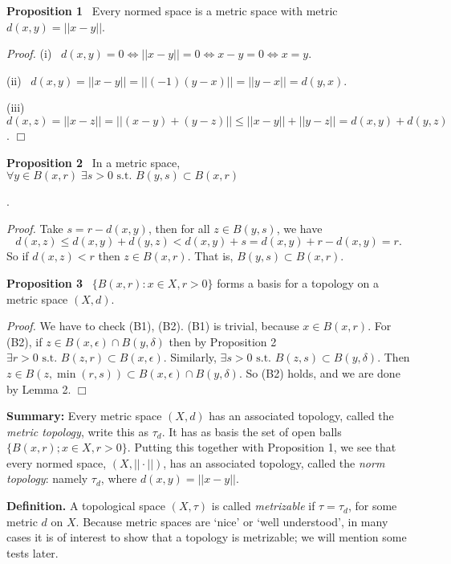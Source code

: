 \documentclass[12pt]{article}
\newcommand{\st}[0]{ \textrm{ s.t. } }
\newcommand{\lrimply}[0] { \Leftrightarrow }
\newcommand{\eps}[0] {  \epsilon }
\begin{document}
\begin{flushleft}
\begin{enumerate}
            \end{enumerate}\end{flushleft}\begin{flushleft} 
 { \bf Proposition  1 } \ Every normed space is a metric space with metric
 $d(x,y) = ||x-y||$.\begin{flushleft} 
 \emph{Proof.  }(i) \ $ d(x,y)=0 \lrimply ||x-y||=0 \lrimply x-y = 0 \lrimply x=y$.

 (ii) \ $d(x,y) = ||x-y|| = ||(-1)(y-x)|| = ||y-x|| = d(y,x)$. 

 (iii) \ $d(x,z) = ||x-z|| = ||(x-y)+(y-z)|| \le ||x-y|| + ||y - z|| = d(x,y) + d(y,z)$. $\Box$ \end{flushleft}\end{flushleft}\begin{flushleft} 
 { \bf Proposition  2 } \ In a metric space,
$\forall y \in B(x,r) \; \exists s > 0 \st B(y,s) \subset B(x,r)$\begin{flushleft}.

 \emph{Proof.  }Take $s = r - d(x,y)$, then for all $z \in B(y, s)$, we have
$$d(x,z) \le d(x,y) + d(y,z) < d(x,y) + s = d(x,y) + r - d(x,y) = r .$$ 
So if  $d(x,z) < r$ then $z \in B(x,r)$.  That is, $B(y,s) \subset B(x,r)$.
\end{flushleft}\end{flushleft}\begin{flushleft} 
 { \bf Proposition 3 } \ $\{ B(x, r) :  x \in X, r>0 \}$ forms a basis for a topology on a metric space $(X, d)$.\begin{flushleft} 
 \emph{Proof.  }We have to check (B1), (B2). (B1) is trivial, because $x \in B(x,r)$. For (B2), 
 if $ z \in B(x,\eps) \cap B(y,\delta)$ then by Proposition 2 
$\exists r>0 \st B(z,r) \subset B(x,\eps)$.  Similarly, $\exists s>0 \st B(z,s) \subset B(y,\delta)$. Then $z \in B(z, \min(r,s)) \subset B(x,\eps) \cap B(y,\delta)$.  So (B2) holds, and we are done by Lemma 2. $\Box$
\end{flushleft}\end{flushleft}\begin{flushleft} 
{\bf  Summary:} Every metric space $(X, d)$ has an associated topology, called the \emph{metric topology}, write this as $\tau_d$. It has as basis the set of open balls $\{ B(x, r); x \in X, r>0 \}$. Putting this together with 
Proposition 1, we see that every normed space, $(X, || \cdot ||)$, 
has an associated topology, called the \emph{norm topology}: namely $\tau_d$, 
where $d(x,y) = ||x-y||$.\end{flushleft}\begin{flushleft} 
 { \bf Definition.}  A topological space $(X, \tau)$ is called \emph{metrizable}
 if $\tau = \tau_d$, for some metric $d$ on $X$. Because metric spaces are 
`nice' or `well understood', in many cases it is of interest to show that a 
topology is metrizable; we will mention some tests later. \end{flushleft}
\end{document}
